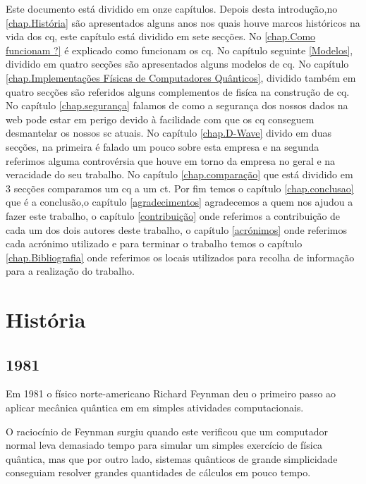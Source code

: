 \documentclass{report}
\begin{document}
	Este documento está dividido em onze capítulos.
	Depois desta introdução,no \autoref{chap.História} são apresentados alguns anos nos quais houve marcos históricos na vida dos \ac{cq}, este capítulo está dividido em sete secções. No \autoref{chap.Como funcionam ?} é explicado como funcionam os \ac{cq}.
	No capítulo seguinte \autoref{Modelos}, dividido em quatro secções são apresentados alguns modelos de \ac{cq}.
	No capítulo \autoref{chap.Implementações Físicas de Computadores Quânticos}, dividido também em quatro secções são referidos alguns complementos  de fisíca na construção de \ac{cq}.
	No capítulo \autoref{chap.segurança} falamos de como a segurança dos nossos dados na web pode estar em perigo devido à facilidade com que os \ac{cq} conseguem desmantelar os nossos \ac{sc} atuais.
	No capítulo \autoref{chap.D-Wave} divido em duas secções, na primeira é falado um pouco sobre esta empresa e na segunda referimos alguma controvérsia que houve em torno da empresa no geral e na veracidade do seu trabalho.
	No capítulo \autoref{chap.comparação}  que está dividido em 3 secções comparamos um \ac{cq} a um \ac{ct}.
	Por fim temos o capítulo \autoref{chap.conclusao} que é a conclusão,o capítulo \autoref{agradecimentos} agradecemos a quem nos ajudou a fazer este trabalho, o capítulo \autoref{contribuição} onde referimos a contribuição de cada um dos dois autores deste trabalho, o capítulo \autoref{acrónimos} onde referimos cada acrónimo utilizado e para terminar o trabalho temos o capítulo \autoref{chap.Bibliografia} onde referimos os locais utilizados para recolha de informação para a realização do trabalho.

\chapter{História}
\label{chap.História}

\section{1981}


	Em 1981 o físico norte-americano Richard Feynman deu o primeiro passo ao aplicar mecânica quântica em em simples atividades computacionais.

	O raciocínio de Feynman surgiu quando este verificou que um computador normal leva demasiado tempo para simular um simples exercício de física quântica, mas que por outro lado, sistemas quânticos de grande simplicidade conseguiam resolver grandes quantidades de cálculos em pouco tempo.
\end{document}
